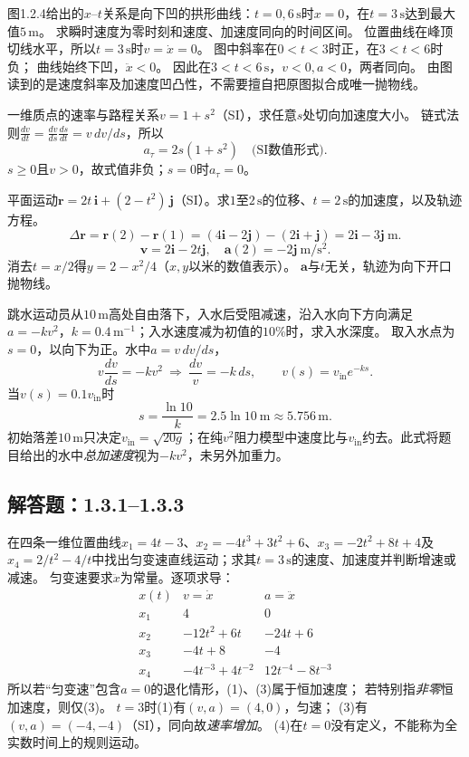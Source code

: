 \problemtext 图1.2.4给出的$x$--$t$关系是向下凹的拱形曲线：$t=0,6\,\mathrm s$时$x=0$，在$t=3\,\mathrm s$达到最大值$5\,\mathrm m$。
求瞬时速度为零时刻和速度、加速度同向的时间区间。
\workings
位置曲线在峰顶切线水平，所以$\boxed{t=3\,\mathrm s}$时$v=\dot x=0$。
图中斜率在$0<t<3$时正，在$3<t<6$时负；
曲线始终下凹，$\ddot x<0$。
因此在$\boxed{3<t<6\,\mathrm s}$，$v<0,a<0$，两者同向。
\crosscheck 由图读到的是速度斜率及加速度凹凸性，不需要擅自把原图拟合成唯一抛物线。

\problemtext 一维质点的速率与路程关系$v=1+s^2$（SI），求任意$s$处切向加速度大小。
\workings
链式法则$\frac{dv}{dt}=\frac{dv}{ds}\frac{ds}{dt}=v\,dv/ds$，所以
\[
\boxed{a_\tau=2s(1+s^2)}\quad\text{(SI数值形式)}.
\]
\crosscheck $s\ge0$且$v>0$，故式值非负；$s=0$时$a_\tau=0$。

\problemtext 平面运动$\bm r=2t\,\bm i+(2-t^2)\,\bm j$（SI）。求$1$至$2\,\mathrm s$的位移、$t=2\,\mathrm s$的加速度，以及轨迹方程。
\workings
\[
\Delta\bm r=\bm r(2)-\bm r(1)
 =(4\bm i-2\bm j)-(2\bm i+\bm j)
 =\boxed{2\bm i-3\bm j\ \mathrm m}.
\]
\[
\bm v=2\bm i-2t\bm j,\quad
\boxed{\bm a(2)=-2\bm j\ \mathrm{m/s^2}}.
\]
消去$t=x/2$得$\boxed{y=2-x^2/4}$（$x,y$以米的数值表示）。
\crosscheck $\bm a$与$t$无关，轨迹为向下开口抛物线。

\problemtext 跳水运动员从$10\,\mathrm m$高处自由落下，入水后受阻减速，沿入水向下方向满足$a=-kv^2$，$k=0.4\,\mathrm{m^{-1}}$；入水速度减为初值的$10\%$时，求入水深度。
\workings
取入水点为$s=0$，以向下为正。水中$a=v\,dv/ds$，
\[
v\frac{dv}{ds}=-kv^2 \ \Longrightarrow\
\frac{dv}{v}=-k\,ds,\qquad
v(s)=v_{\mathrm{in}}e^{-ks}.
\]
当$v(s)=0.1v_{\mathrm{in}}$时
\[
\boxed{s=\frac{\ln10}{k}=2.5\ln10\ \mathrm m\approx5.756\,\mathrm m}.
\]
\crosscheck 初始落差$10\,\mathrm m$只决定$v_{\mathrm{in}}=\sqrt{20g}$；在纯$v^2$阻力模型中速度比与$v_{\mathrm{in}}$约去。此式将题目给出的水中\emph{总加速度}视为$-kv^2$，未另外加重力。

\subsection{解答题：1.3.1--1.3.3}
\problemtext 在四条一维位置曲线$x_1=4t-3$、$x_2=-4t^3+3t^2+6$、$x_3=-2t^2+8t+4$及$x_4=2/t^2-4/t$中找出匀变速直线运动；求其$t=3\,\mathrm s$的速度、加速度并判断增速或减速。
\workings
匀变速要求$\ddot x$为常量。逐项求导：
\[
\begin{array}{l|l|l}
x(t)&v=\dot x&a=\ddot x\\ \hline
x_1&4&0\\
x_2&-12t^2+6t&-24t+6\\
x_3&-4t+8&-4\\
x_4&-4t^{-3}+4t^{-2}&12t^{-4}-8t^{-3}
\end{array}
\]
所以若“匀变速”包含$a=0$的退化情形，(1)、(3)属于恒加速度；
若特别指\emph{非零}恒加速度，则仅(3)。
$t=3$时(1)有$(v,a)=(4,0)$，匀速；
(3)有$(v,a)=(-4,-4)$（SI），同向故\emph{速率增加}。
\crosscheck (4)在$t=0$没有定义，不能称为全实数时间上的规则运动。

